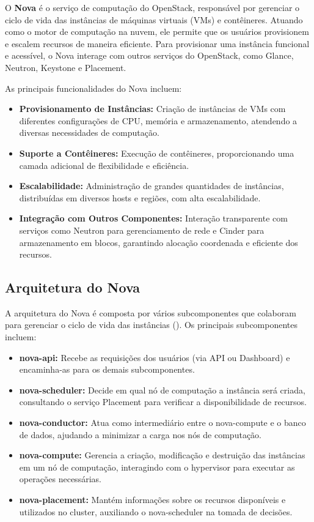 O \textbf{Nova} é o serviço de computação do OpenStack, responsável por gerenciar o ciclo de vida das instâncias de máquinas virtuais (VMs) e contêineres. Atuando como o motor de computação na nuvem, ele permite que os usuários provisionem e escalem recursos de maneira eficiente. Para provisionar uma instância funcional e acessível, o Nova interage com outros serviços do OpenStack, como Glance, Neutron, Keystone e Placement.

As principais funcionalidades do Nova incluem:

\begin{itemize}
    \item \textbf{Provisionamento de Instâncias:} Criação de instâncias de VMs com diferentes configurações de CPU, memória e armazenamento, atendendo a diversas necessidades de computação.
    \item \textbf{Suporte a Contêineres:} Execução de contêineres, proporcionando uma camada adicional de flexibilidade e eficiência.
    \item \textbf{Escalabilidade:} Administração de grandes quantidades de instâncias, distribuídas em diversos hosts e regiões, com alta escalabilidade.
    \item \textbf{Integração com Outros Componentes:} Interação transparente com serviços como Neutron para gerenciamento de rede e Cinder para armazenamento em blocos, garantindo alocação coordenada e eficiente dos recursos.
\end{itemize}

\subsection{Arquitetura do Nova}

A arquitetura do Nova é composta por vários subcomponentes que colaboram para gerenciar o ciclo de vida das instâncias (\cite{OpenStackNovaArchitecture}). Os principais subcomponentes incluem:

\begin{itemize}
    \item \textbf{nova-api:} Recebe as requisições dos usuários (via API ou Dashboard) e encaminha-as para os demais subcomponentes.
    \item \textbf{nova-scheduler:} Decide em qual nó de computação a instância será criada, consultando o serviço Placement para verificar a disponibilidade de recursos.
    \item \textbf{nova-conductor:} Atua como intermediário entre o nova-compute e o banco de dados, ajudando a minimizar a carga nos nós de computação.
    \item \textbf{nova-compute:} Gerencia a criação, modificação e destruição das instâncias em um nó de computação, interagindo com o hypervisor para executar as operações necessárias.
    \item \textbf{nova-placement:} Mantém informações sobre os recursos disponíveis e utilizados no cluster, auxiliando o nova-scheduler na tomada de decisões.
\end{itemize}


